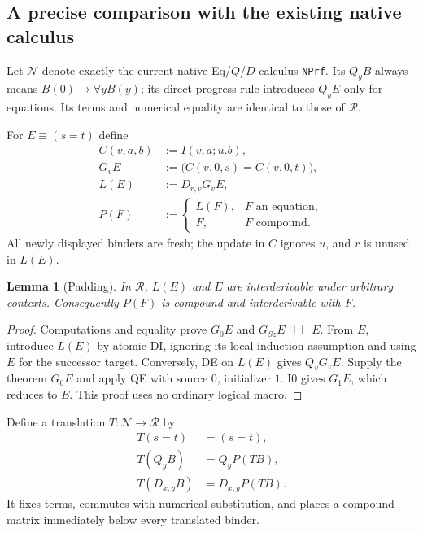 \documentclass[11pt,a4paper]{article}
\newtheorem{lemma}[theorem]{Lemma}
\theoremstyle{definition}\newtheorem{definition}[theorem]{Definition}
\begin{document}
\subsection{A precise comparison with the existing native calculus}
\label{subsec:new-native-comparison}

Let $\mathcal N$ denote exactly the current native Eq/$Q$/$D$ calculus
\texttt{NPrf}.  Its $Q_yB$ always means $B(0)\to\forall yB(y)$; its direct
progress rule introduces $Q_yE$ only for equations.  Its terms and numerical
equality are identical to those of $\mathcal R$.

For $E\equiv(s=t)$ define
\begin{equation}
 \begin{aligned}
 C(v,a,b)&:=I(v,a;u.b),\\
 G_vE&:=\bigl(C(v,0,s)=C(v,0,t)\bigr),\\
 L(E)&:=D_{r,v}G_vE,\\
 P(F)&:=\begin{cases}L(F),&F\text{ an equation},\\F,&F\text{ compound}.
              \end{cases}
 \end{aligned}
 \label{eq:new-padding}
\end{equation}
All newly displayed binders are fresh; the update in $C$ ignores $u$, and
$r$ is unused in $L(E)$.

\begin{lemma}[Padding]
\label{lem:new-padding}
In $\mathcal R$, $L(E)$ and $E$ are interderivable under arbitrary contexts.
Consequently $P(F)$ is compound and interderivable with $F$.
\end{lemma}
\begin{proof}
Computations and equality prove $G_0E$ and
$G_{Sz}E\dashv\vdash E$.  From $E$, introduce $L(E)$ by atomic DI, ignoring
its local induction assumption and using $E$ for the successor target.
Conversely, DE on $L(E)$ gives $Q_vG_vE$.  Supply the theorem $G_0E$ and
apply QE with source $0$, initializer $1$.  I0 gives $G_1E$, which reduces
to $E$.  This proof uses no ordinary logical macro.
\end{proof}

Define a translation $T:\mathcal N\to\mathcal R$ by
\begin{equation}
 \begin{aligned}
 T(s=t)&=(s=t),\\
 T(Q_yB)&=Q_yP(TB),\\
 T(D_{x,y}B)&=D_{x,y}P(TB).
 \end{aligned}
 \label{eq:new-T}
\end{equation}
It fixes terms, commutes with numerical substitution, and places a compound
matrix immediately below every translated binder.
\end{document}
